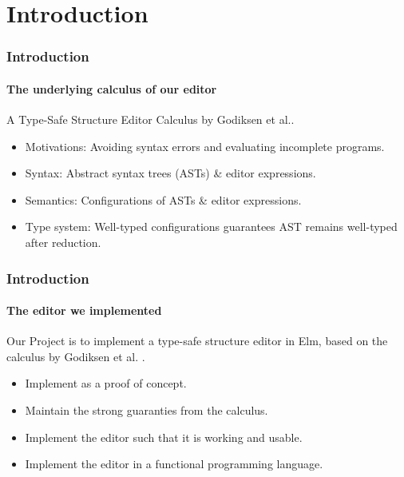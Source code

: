 \section{Introduction}
\begin{frame}
    \frametitle{Introduction}
    \framesubtitle{The underlying calculus of our editor}

        A Type-Safe Structure Editor Calculus by Godiksen et al.\pepm.
        \begin{itemize}
            \item Motivations: Avoiding syntax errors and evaluating incomplete programs.
                \pause
              \item Syntax: Abstract syntax trees (ASTs) \& editor expressions.
                \pause
            \item Semantics: Configurations of ASTs \& editor expressions.
                \pause
            \item Type system: Well-typed configurations guarantees AST remains well-typed after reduction.
        \end{itemize}
\end{frame}
\begin{frame}
    \frametitle{Introduction}
    \framesubtitle{The editor we implemented}

        Our Project is to implement a type-safe structure editor in Elm, based on the calculus by Godiksen et al. \pepm.
        \begin{itemize}
            \item Implement as a proof of concept.
                \pause
            \item Maintain the strong guaranties from the calculus.
                \pause
            \item Implement the editor such that it is working and usable.
                \pause
            \item Implement the editor in a functional programming language.
        \end{itemize}

\end{frame}
